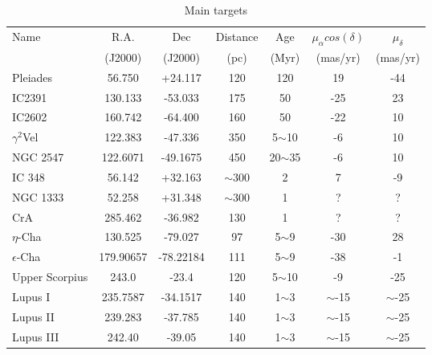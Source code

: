 \begin{table*}
\caption{Main targets}      
\label{tab:maintargets}    
\centering                     
\begin{tabular}{l c c c c c c}  
\hline
\hline
Name & R.A.  & Dec  & Distance & Age & $\mu_{\alpha} cos(\delta)$ & $\mu_{\delta}$ \\
  & (J2000) & (J2000) & (pc) & (Myr) & (mas/yr) & (mas/yr) \\
\hline
Pleiades                &  56.750     &  +24.117   	 &   120               &    120           &  19                                       &  -44                          \\
 IC2391             &  130.133    &  -53.033   	 &   175               &    50            &  -25                                      &  23                           \\
 IC2602             &  160.742    &  -64.400   	 &   160               &    50            &  -22                                      &  10                           \\
 $\gamma^{2}$Vel    &  122.383    &  -47.336   	 &   350               &    5$\sim$10     &  -6                                       &  10                                                 \\
 NGC 2547    &  122.6071     &  -49.1675   	 &   450               &    20$\sim$35     &  -6                                       &  10                           \\
 IC 348   &  56.142   &  +32.163 	 &   $\sim$300  &  2   &  7    &  -9   \\
 NGC 1333   &  52.258   &  +31.348 	 &   $\sim$300   &  1   &  ?    &  ?   \\
 CrA   &  285.462    &  -36.982  	 &   130    &  1   &  ?    &  ?   \\
 $\eta$-Cha   &  130.525     &  -79.027  	 &   97    &  5$\sim$9   &  -30    &  28   \\
 $\epsilon$-Cha   &  179.90657  &  -78.22184  	 &   111    &  5$\sim$9   &  -38    &  -1   \\
 Upper Scorpius   &  243.0     &  -23.4   	 &   120    &  5$\sim$10   &  -9    &  -25   \\
 Lupus I   &  235.7587      &  -34.1517  	 &   140    &  1$\sim$3   &  $\sim$-15    &  $\sim$-25   \\
 Lupus II   &  239.283       &  -37.785  	 &   140    &  1$\sim$3   &  $\sim$-15    &  $\sim$-25   \\
 Lupus III   &  242.40       &  -39.05   	 &   140    &  1$\sim$3   &  $\sim$-15    &  $\sim$-25   \\

\end{tabular}
\end{table*}
